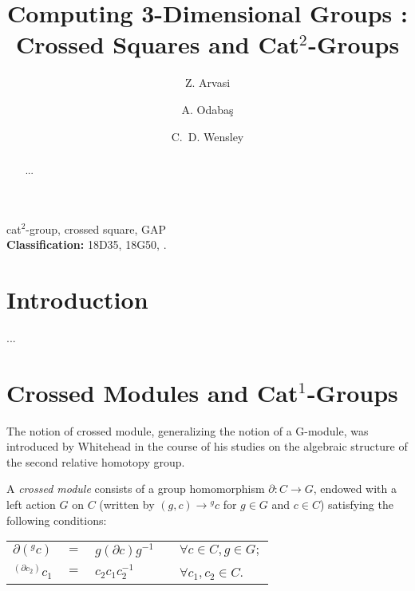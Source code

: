 \documentclass[a4paper,11pt]{article}
\theoremstyle{plain}
\theoremstyle{definition}
\begin{document}
\title{Computing 3-Dimensional Groups : Crossed Squares and  Cat$^2$-Groups}

\author[a]{Z. Arvasi}
\author[a]{A. Odaba\c{s}}
\author[b]{C.~D. Wensley}

\date{}

\maketitle

\begin{abstract}
...\end{abstract}

 cat$^2$-group, crossed square, \textsf{GAP}
\\ {\bf Classification:} 18D35, 18G50, .

\section{Introduction}

...

\section{Crossed Modules and Cat$^{1}$-Groups}

The notion of crossed module, generalizing the notion of a G-module, 
was introduced by Whitehead \cite{wayted} in the course of his studies on the
algebraic structure of the second relative homotopy group.

A \emph{crossed module} consists of a group homomorphism $\partial
:C\rightarrow G$, endowed with a left action $G$ on $C$ 
(written by $(g,c)\rightarrow {}^{g}c$ for $g\in G$ and $c\in C$) 
satisfying the
following conditions:

\begin{center}
	\begin{tabular}{rclll}
		$\partial (^{g}c)$ 
		& $=$ 
		& $g(\partial c)g^{-1}$ 
		&   & $\forall c\in C,g\in G; $ \\
		$^{(\partial c_{2})}c_{1}$ 
		& $=$ 
		& ${c}_{2}c_{1}c_{2}^{-1}$ 
		&   & $\forall c_{1},c_{2}\in C$. 
	\end{tabular}
\end{center}
\end{document}
